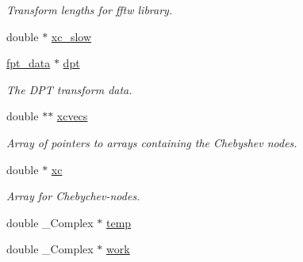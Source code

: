 \begin{CompactItemize}
\begin{CompactList}\small\item\em Transform lengths for fftw library. \item\end{CompactList}\item 
\hypertarget{structfpt__set__s_97d7abaf8a8772aebc59ee20b6d41c93}{
double $\ast$ \hyperlink{structfpt__set__s_97d7abaf8a8772aebc59ee20b6d41c93}{xc\_\-slow}}
\label{structfpt__set__s_97d7abaf8a8772aebc59ee20b6d41c93}

\item 
\hypertarget{structfpt__set__s_83cab05366d06e3e442865967c7b9ca1}{
\hyperlink{structfpt__data}{fpt\_\-data} $\ast$ \hyperlink{structfpt__set__s_83cab05366d06e3e442865967c7b9ca1}{dpt}}
\label{structfpt__set__s_83cab05366d06e3e442865967c7b9ca1}

\begin{CompactList}\small\item\em The DPT transform data. \item\end{CompactList}\item 
\hypertarget{structfpt__set__s_2775cb8a0a1f0b45114bdf9b4976d118}{
double $\ast$$\ast$ \hyperlink{structfpt__set__s_2775cb8a0a1f0b45114bdf9b4976d118}{xcvecs}}
\label{structfpt__set__s_2775cb8a0a1f0b45114bdf9b4976d118}

\begin{CompactList}\small\item\em Array of pointers to arrays containing the Chebyshev nodes. \item\end{CompactList}\item 
double $\ast$ \hyperlink{structfpt__set__s_b84648e5abdffa255d8b77e4fb19a3c4}{xc}
\begin{CompactList}\small\item\em Array for Chebychev-nodes. \item\end{CompactList}\item 
\hypertarget{structfpt__set__s_58270153ad4019aa255d97b2bf66ff87}{
double \_\-Complex $\ast$ \hyperlink{structfpt__set__s_58270153ad4019aa255d97b2bf66ff87}{temp}}
\label{structfpt__set__s_58270153ad4019aa255d97b2bf66ff87}

\item 
\hypertarget{structfpt__set__s_4606aac141a1340ce6524388c7475883}{
double \_\-Complex $\ast$ \hyperlink{structfpt__set__s_4606aac141a1340ce6524388c7475883}{work}}
\label{structfpt__set__s_4606aac141a1340ce6524388c7475883}


\end{CompactItemize}
